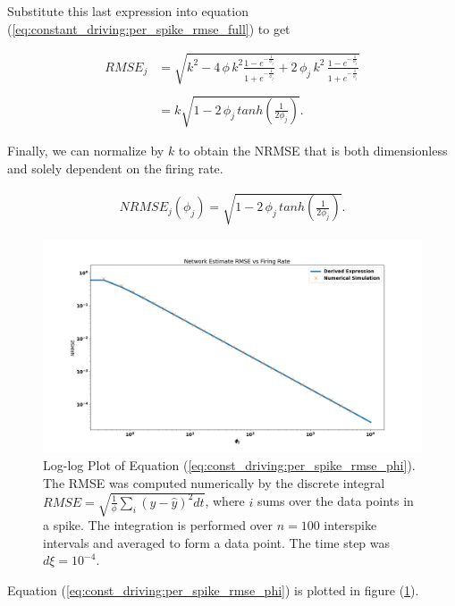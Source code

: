 Substitute this last expression into equation (\ref{eq:constant_driving:per_spike_rmse_full}) to get

\begin{align*}
RMSE_{j} 
&=
\sqrt
{
k^2 - 
4 \, \phi \, k^2 \frac{1 - e^{-\frac{1}{\phi_j}}}{1 + e^{-\frac{1}{\phi_j}}} + 2 \, \phi_j \, k^2 \, \frac{1 - e^{-\frac{1}{\phi_j}}}{1 + e^{-\frac{1}{\phi_j}}}
}
\\
\\
&=
k \sqrt
{
1 - 2 \, \phi_j \,  tanh\left(\frac{1}{2\phi_j}\right)
}.
\end{align*}

Finally, we can normalize by $k$ to obtain the  NRMSE that is both dimensionless and solely dependent on the firing rate. 

\begin{align}
\label{eq:const_driving:per_spike_rmse_phi}
NRMSE_{j}(\phi_j) = \sqrt
{
1 - 2 \, \phi_j \,  tanh\left(\frac{1}{2\phi_j}\right)
}. 
\end{align}


\begin{figure}
\centering
\includegraphics[width=\linewidth]{figures/per_spike_nrmse_vs_phi}
\caption{Log-log Plot of Equation (\ref{eq:const_driving:per_spike_rmse_phi}). The RMSE was computed numerically by the discrete integral $RMSE = \sqrt{\frac{1}{\phi} \sum_{i} (y - \hat{y})^2 dt}$, where $i$ sums over the data points in a spike. The integration is performed over $n = 100$ interspike intervals and averaged to form a data point. The time step was $d\xi = 10^{-4}$.}
\label{fig:const_driving:per_spike_nrmse_vs_phi}
\end{figure}

Equation (\ref{eq:const_driving:per_spike_rmse_phi}) is plotted in figure (\ref{fig:const_driving:per_spike_nrmse_vs_phi}).

\clearpage

